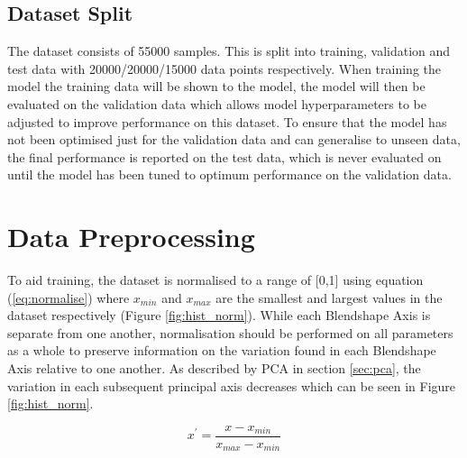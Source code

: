 \subsection{Dataset Split}
The dataset consists of 55000 samples.
This is split into training, validation and test data with 20000/20000/15000 data points respectively.
When training the model the training data will be shown to the model, the model will then be evaluated on the validation data which allows model hyperparameters to be adjusted to improve performance on this dataset.
To ensure that the model has not been optimised just for the validation data and can generalise to unseen data, the final performance is reported on the test data, which is never evaluated on until the model has been tuned to optimum performance on the validation data.

\section{Data Preprocessing}
To aid training, the dataset is normalised to a range of [0,1] using equation (\ref{eq:normalise}) where $x_{min}$ and $x_{max}$ are the smallest and largest values in the dataset respectively (Figure \ref{fig:hist_norm}).
While each Blendshape Axis is separate from one another, normalisation should be performed on all parameters as a whole to preserve information on the variation found in each Blendshape Axis relative to one another.
As described by PCA in section \ref{sec:pca}, the variation in each subsequent principal axis decreases which can be seen in Figure \ref{fig:hist_norm}.

\begin{equation}\label{eq:normalise}
   x^\prime = \frac{x - x_{min}}{x_{max} - x_{min}} 
\end{equation}

